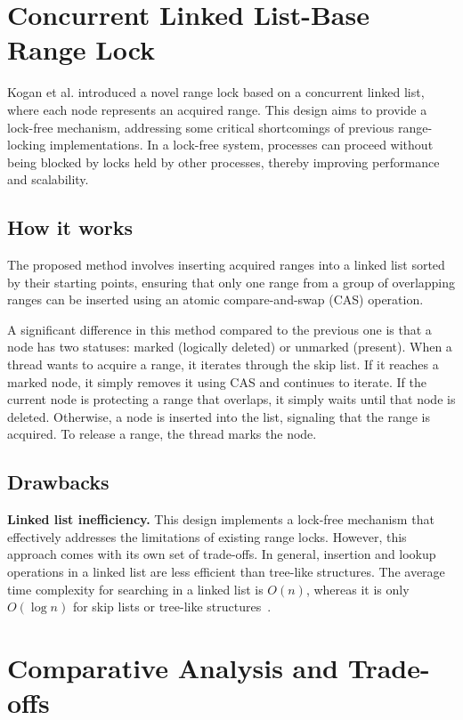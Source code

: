 \section{Concurrent Linked List-Base Range Lock}

Kogan et al. \cite{kogan2020scalable} introduced a novel range lock based on a concurrent linked list, where each node represents an acquired range. This design aims to provide a lock-free mechanism, addressing some critical shortcomings of previous range-locking implementations. In a lock-free system, processes can proceed without being blocked by locks held by other processes, thereby improving performance and scalability. 

\subsection*{How it works}

The proposed method involves inserting acquired ranges into a linked list sorted by their starting points, ensuring that only one range from a group of overlapping ranges can be inserted using an atomic compare-and-swap (CAS) operation.

A significant difference in this method compared to the previous one is that a node has two statuses: marked (logically deleted) or unmarked (present). When a thread wants to acquire a range, it iterates through the skip list. If it reaches a marked node, it simply removes it using CAS and continues to iterate. If the current node is protecting a range that overlaps, it simply waits until that node is deleted. Otherwise, a node is inserted into the list, signaling that the range is acquired. To release a range, the thread marks the node. 

\subsection*{Drawbacks}

\textbf{Linked list inefficiency.}
This design implements a lock-free mechanism that effectively addresses the limitations of existing range locks. However, this approach comes with its own set of trade-offs. In general, insertion and lookup operations in a linked list are less efficient than tree-like structures. The average time complexity for searching in a linked list is \( O(n) \), whereas it is only \( O(\log n) \) for skip lists or tree-like structures~\parencite{fomitchev2004lock}.


\section{Comparative Analysis and Trade-offs}

